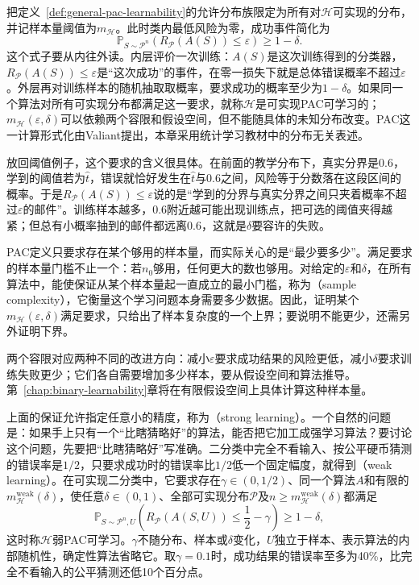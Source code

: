 把定义~\ref{def:general-pac-learnability}的允许分布族限定为所有对$\mathcal H$可实现的分布，并记样本量阈值为$m_{\mathcal H}$。此时类内最低风险为零，成功事件简化为
\begin{equation}
 \mathbb P_{S\sim\mathcal P^n}
 \left(R_{\mathcal P}(A(S))\leq\varepsilon\right)\geq1-\delta.
 \label{eq:pac-guarantee}
\end{equation}
这个式子要从内往外读。内层评价一次训练：$A(S)$是这次训练得到的分类器，$R_{\mathcal P}(A(S))\leq\varepsilon$是“这次成功”的事件，在零一损失下就是总体错误概率不超过$\varepsilon$。外层再对训练样本的随机抽取取概率，要求成功的概率至少为$1-\delta$。如果同一个算法对所有可实现分布都满足这一要求，就称$\mathcal H$是可实现PAC可学习的；$m_{\mathcal H}(\varepsilon,\delta)$可以依赖两个容限和假设空间，但不能随具体的未知分布改变。PAC这一计算形式化由Valiant提出，本章采用统计学习教材中的分布无关表述。

放回阈值例子，这个要求的含义很具体。在前面的教学分布下，真实分界是0.6，学到的阈值若为$\hat t$，错误就恰好发生在$\hat t$与0.6之间，风险等于分数落在这段区间的概率。于是$R_{\mathcal P}(A(S))\leq\varepsilon$说的是“学到的分界与真实分界之间只夹着概率不超过$\varepsilon$的邮件”。训练样本越多，0.6附近越可能出现训练点，把可选的阈值夹得越紧；但总有小概率抽到的邮件都远离0.6，这就是$\delta$要容许的失败。

PAC定义只要求存在某个够用的样本量，而实际关心的是“最少要多少”。满足要求的样本量门槛不止一个：若$n_0$够用，任何更大的数也够用。对给定的$\varepsilon$和$\delta$，在所有算法中，能使保证从某个样本量起一直成立的最小门槛，称为（sample complexity），它衡量这个学习问题本身需要多少数据。因此，证明某个$m_{\mathcal H}(\varepsilon,\delta)$满足要求，只给出了样本复杂度的一个上界；要说明不能更少，还需另外证明下界。

两个容限对应两种不同的改进方向：减小$\varepsilon$要求成功结果的风险更低，减小$\delta$要求训练失败更少；它们各自需要增加多少样本，要从假设空间和算法推导。第~\ref{chap:binary-learnability}章将在有限假设空间上具体计算这种样本量。

上面的保证允许指定任意小的精度，称为（strong learning）。一个自然的问题是：如果手上只有一个“比瞎猜略好”的算法，能否把它加工成强学习算法？要讨论这个问题，先要把“比瞎猜略好”写准确。二分类中完全不看输入、按公平硬币猜测的错误率是$1/2$，只要求成功时的错误率比$1/2$低一个固定幅度，就得到（weak learning）。在可实现二分类中，它要求存在$\gamma\in(0,1/2)$、同一个算法$A$和有限的$m_{\mathcal H}^{\mathrm{weak}}(\delta)$，使任意$\delta\in(0,1)$、全部可实现分布$\mathcal P$及$n\geq m_{\mathcal H}^{\mathrm{weak}}(\delta)$都满足
\[
 \mathbb P_{S\sim\mathcal P^n,U}\!\left(
 R_{\mathcal P}(A(S,U))\leq\frac12-\gamma
 \right)\geq1-\delta,
\]
这时称$\mathcal H$弱PAC可学习。$\gamma$不随分布、样本或$\delta$变化，$U$独立于样本、表示算法的内部随机性，确定性算法省略它。取$\gamma=0.1$时，成功结果的错误率至多为40\%，比完全不看输入的公平猜测还低10个百分点。

